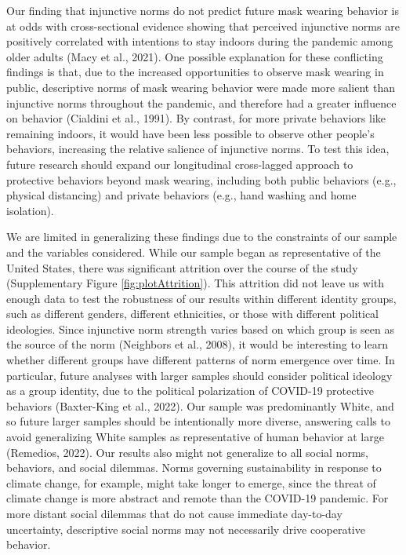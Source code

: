 \documentclass[
  english,
  man,floatsintext]{apa6}
\begin{document}
Our finding that injunctive norms do not predict future mask wearing behavior is at odds with cross-sectional evidence showing that perceived injunctive norms are positively correlated with intentions to stay indoors during the pandemic among older adults (Macy et al., 2021). One possible explanation for these conflicting findings is that, due to the increased opportunities to observe mask wearing in public, descriptive norms of mask wearing behavior were made more salient than injunctive norms throughout the pandemic, and therefore had a greater influence on behavior (Cialdini et al., 1991). By contrast, for more private behaviors like remaining indoors, it would have been less possible to observe other people's behaviors, increasing the relative salience of injunctive norms. To test this idea, future research should expand our longitudinal cross-lagged approach to protective behaviors beyond mask wearing, including both public behaviors (e.g., physical distancing) and private behaviors (e.g., hand washing and home isolation).

We are limited in generalizing these findings due to the constraints of our sample and the variables considered. While our sample began as representative of the United States, there was significant attrition over the course of the study (Supplementary Figure \ref{fig:plotAttrition}). This attrition did not leave us with enough data to test the robustness of our results within different identity groups, such as different genders, different ethnicities, or those with different political ideologies. Since injunctive norm strength varies based on which group is seen as the source of the norm (Neighbors et al., 2008), it would be interesting to learn whether different groups have different patterns of norm emergence over time. In particular, future analyses with larger samples should consider political ideology as a group identity, due to the political polarization of COVID-19 protective behaviors (Baxter-King et al., 2022). Our sample was predominantly White, and so future larger samples should be intentionally more diverse, answering calls to avoid generalizing White samples as representative of human behavior at large (Remedios, 2022). Our results also might not generalize to all social norms, behaviors, and social dilemmas. Norms governing sustainability in response to climate change, for example, might take longer to emerge, since the threat of climate change is more abstract and remote than the COVID-19 pandemic. For more distant social dilemmas that do not cause immediate day-to-day uncertainty, descriptive social norms may not necessarily drive cooperative behavior.
\end{document}
